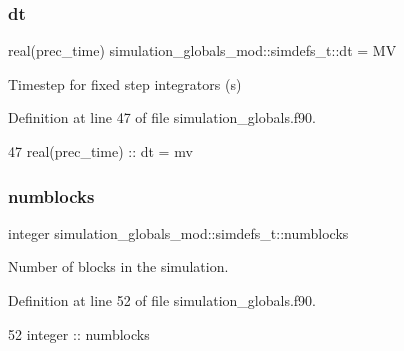 \subsubsection{\texorpdfstring{dt}{dt}}
{\footnotesize\ttfamily real(prec\+\_\+time) simulation\+\_\+globals\+\_\+mod\+::simdefs\+\_\+t\+::dt = MV\hspace{0.3cm}{\ttfamily [private]}}



Timestep for fixed step integrators (s) 



Definition at line 47 of file simulation\+\_\+globals.\+f90.


\begin{DoxyCode}
47         \textcolor{keywordtype}{real(prec\_time)} ::  dt = mv         
\end{DoxyCode}
\mbox{\label{structsimulation__globals__mod_1_1simdefs__t_a6b7497df8a36fe045f2096963db3bdde}} 
\subsubsection{\texorpdfstring{numblocks}{numblocks}}
{\footnotesize\ttfamily integer simulation\+\_\+globals\+\_\+mod\+::simdefs\+\_\+t\+::numblocks\hspace{0.3cm}{\ttfamily [private]}}



Number of blocks in the simulation. 



Definition at line 52 of file simulation\+\_\+globals.\+f90.


\begin{DoxyCode}
52         \textcolor{keywordtype}{integer}         ::  numblocks
\end{DoxyCode}
\mbox{\label{structsimulation__globals__mod_1_1simdefs__t_a0437ce61f2882028c5e3ca0212aeaf24}} 
